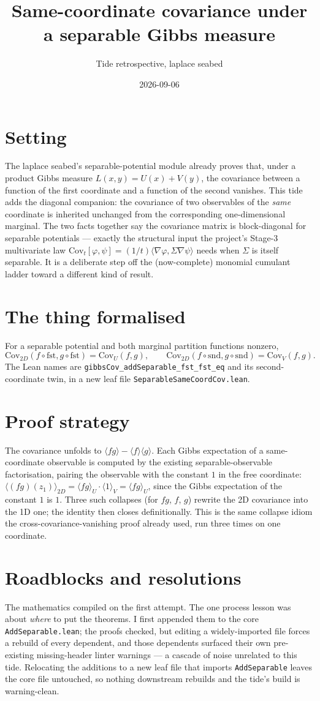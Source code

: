 \documentclass[11pt]{article}
\title{Same-coordinate covariance under a separable Gibbs measure}
\author{Tide retrospective, laplace seabed}
\date{2026-09-06}
\begin{document}
\sloppy
\maketitle
\section{Setting}
The laplace seabed's separable-potential module already proves that, under a product Gibbs measure
$L(x,y) = U(x)+V(y)$, the covariance between a function of the first coordinate and a function of the
second vanishes. This tide adds the diagonal companion: the covariance of two observables of the
\emph{same} coordinate is inherited unchanged from the corresponding one-dimensional marginal. The two
facts together say the covariance matrix is block-diagonal for separable potentials --- exactly the
structural input the project's Stage-3 multivariate law $\mathrm{Cov}_t[\varphi,\psi] = (1/t)\langle
\nabla\varphi, \Sigma\nabla\psi\rangle$ needs when $\Sigma$ is itself separable. It is a deliberate
step off the (now-complete) monomial cumulant ladder toward a different kind of result.
\section{The thing formalised}
For a separable potential and both marginal partition functions nonzero,
\[
  \mathrm{Cov}_{2D}(f\circ\mathrm{fst}, g\circ\mathrm{fst}) = \mathrm{Cov}_U(f,g),\qquad
  \mathrm{Cov}_{2D}(f\circ\mathrm{snd}, g\circ\mathrm{snd}) = \mathrm{Cov}_V(f,g).
\]
The Lean names are \texttt{gibbsCov\_addSeparable\_fst\_fst\_eq} and its second-coordinate twin, in a
new leaf file \texttt{SeparableSameCoordCov.lean}.
\section{Proof strategy}
The covariance unfolds to $\langle fg\rangle - \langle f\rangle\langle g\rangle$. Each Gibbs
expectation of a same-coordinate observable is computed by the existing separable-observable
factorisation, pairing the observable with the constant $1$ in the free coordinate: $\langle
(fg)(z_1)\rangle_{2D} = \langle fg\rangle_U\cdot\langle 1\rangle_V = \langle fg\rangle_U$, since the
Gibbs expectation of the constant $1$ is $1$. Three such collapses (for $fg$, $f$, $g$) rewrite the
2D covariance into the 1D one; the identity then closes definitionally. This is the same collapse
idiom the cross-covariance-vanishing proof already used, run three times on one coordinate.
\section{Roadblocks and resolutions}
The mathematics compiled on the first attempt. The one process lesson was about \emph{where} to put
the theorems. I first appended them to the core \texttt{AddSeparable.lean}; the proofs checked, but
editing a widely-imported file forces a rebuild of every dependent, and those dependents surfaced
their own pre-existing missing-header linter warnings --- a cascade of noise unrelated to this tide.
Relocating the additions to a new leaf file that imports \texttt{AddSeparable} leaves the core file
untouched, so nothing downstream rebuilds and the tide's build is warning-clean.
\end{document}
